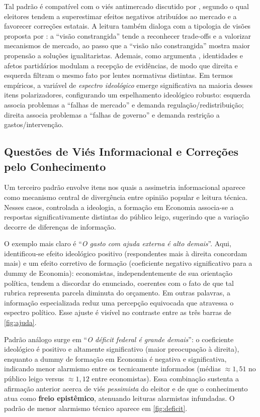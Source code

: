 Tal padrão é compatível com o viés antimercado discutido por , segundo o qual eleitores tendem a superestimar efeitos negativos atribuídos ao mercado e a favorecer correções estatais. A leitura também dialoga com a tipologia de visões proposta por : a ``visão constrangida'' tende a reconhecer trade-offs e a valorizar mecanismos de mercado, ao passo que a ``visão não constrangida'' mostra maior propensão a soluções igualitaristas. Ademais, como argumenta , identidades e afetos partidários modulam a recepção de evidências, de modo que direita e esquerda filtram o mesmo fato por lentes normativas distintas. Em termos empíricos, a variável de \textit{espectro ideológico} emerge significativa na maioria desses itens polarizadores, configurando um espelhamento ideológico robusto: esquerda associa problemas a ``falhas de mercado'' e demanda regulação/redistribuição; direita associa problemas a ``falhas de governo'' e demanda restrição a gastos/intervenção.

\subsection{Questões de Viés Informacional e Correções pelo Conhecimento}
Um terceiro padrão envolve itens nos quais a assimetria informacional aparece como mecanismo central de divergência entre opinião popular e leitura técnica. Nesses casos, controlada a ideologia, a formação em Economia associa-se a respostas significativamente distintas do público leigo, sugerindo que a variação decorre de diferenças de informação.

O exemplo mais claro é ``\textit{O gasto com ajuda externa é alto demais}''. Aqui, identificou-se efeito ideológico positivo (respondentes mais à direita concordam mais) e um efeito corretivo de formação (coeficiente negativo significativo para a dummy de Economia): economistas, independentemente de sua orientação política, tendem a discordar do enunciado, coerentes com o fato de que tal rubrica representa parcela diminuta do orçamento. Em outras palavras, a informação especializada reduz uma percepção equivocada que atravessa o espectro político. Esse ajuste é visível no contraste entre as três barras de \autoref{fig:ajuda}.

Padrão análogo surge em ``\textit{O déficit federal é grande demais}'': o coeficiente ideológico é positivo e altamente significativo (maior preocupação à direita), enquanto a dummy de formação em Economia é negativa e significativa, indicando menor alarmismo entre os tecnicamente informados (médias $\approx1{,}51$ no público leigo versus $\approx1{,}12$ entre economistas). Essa combinação sustenta a afirmação anterior acerca de viés \textit{pessimista} do eleitor e de que o conhecimento atua como \textbf{freio epistêmico}, atenuando leituras alarmistas infundadas. O padrão de menor alarmismo técnico aparece em \autoref{fig:deficit}.

